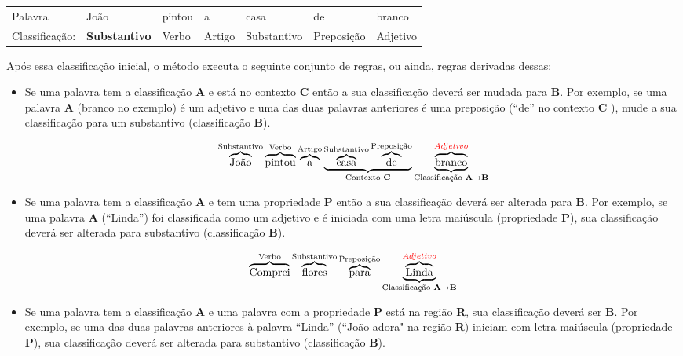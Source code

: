 \begin{table}[htb]
\centering
\begin{tabular}{l|l|l|l|l|l|l}
Palavra         & João        & pintou & a      & casa        & de
& branco
\\
Classificação:   & \textbf{Substantivo} & Verbo  & Artigo & Substantivo &
Preposição & Adjetivo
\end{tabular}
\label{my-label}
\end{table}



Após essa classificação inicial, o método executa o seguinte conjunto de
regras, ou ainda, regras derivadas dessas:

\begin{itemize}
  \item Se uma palavra tem a classificação \textbf{A} e está no contexto
  \textbf{C} então a sua classificação deverá ser mudada para \textbf{B}. Por
  exemplo, se uma palavra \textbf{A} (branco no exemplo) é um adjetivo e uma das
  duas palavras anteriores é uma preposição (``de'' no contexto \textbf{C}
  ), mude a sua classificação para um substantivo (classificação \textbf{B}).
  
  \[\overbrace{\text{João}}^\text{Substantivo}
  \overbrace{\text{pintou}}^\text{Verbo}
  \overbrace{\text{a}}^\text{Artigo}
  \underbrace{
  \overbrace{\text{casa}}^\text{Substantivo}
  \overbrace{\text{de}}^\text{Preposição}}_\text{Contexto \textbf{C}}
  \underbrace{\overbrace{\text{branco}}^{\textcolor{red}{Adjetivo}}}_\text{Classificação
  \textbf{A}\textrightarrow\textbf{B}}
  \]
  
  \item Se uma palavra tem a classificação \textbf{A} e tem uma propriedade
  \textbf{P} então a sua classificação deverá ser alterada para \textbf{B}. Por
  exemplo, se uma palavra \textbf{A} (``Linda'') foi classificada como um
  adjetivo e é iniciada com uma letra maiúscula (propriedade \textbf{P}), sua
  classificação deverá ser alterada para substantivo (classificação \textbf{B}).
  
  \[\overbrace{\text{Comprei}}^\text{Verbo}
  \overbrace{\text{flores}}^\text{Substantivo}
  \overbrace{\text{para}}^\text{Preposição}
  \underbrace{\overbrace{\text{L}\text{inda}}^{\textcolor{red}{Adjetivo}}}_\text{Classificação
  \textbf{A}\textrightarrow\textbf{B}}
  \]
  
  \item Se uma palavra tem a classificação \textbf{A} e uma palavra com a
  propriedade \textbf{P} está na região \textbf{R}, sua classificação deverá
  ser \textbf{B}. Por exemplo, se uma das duas palavras anteriores à palavra
  ``Linda'' (``João adora" na região \textbf{R}) iniciam com letra maiúscula
  (propriedade \textbf{P}), sua classificação deverá ser alterada para substantivo (classificação \textbf{B}).
  

\end{itemize}
